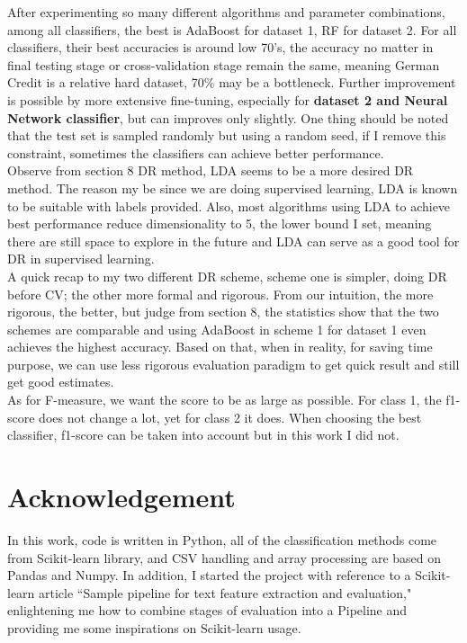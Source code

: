\documentclass[11pt,a4paper]{article}
\begin{document}
After experimenting so many different algorithms and parameter combinations, among all classifiers, the best is AdaBoost for dataset 1, RF for dataset 2. For all classifiers, their best accuracies is around low 70's, the accuracy no matter in final testing stage or cross-validation stage remain the same, meaning German Credit is a relative hard dataset, 70\% may be a bottleneck. Further improvement is possible by more extensive fine-tuning, especially for \textbf{dataset 2 and Neural Network classifier}, but can improves only slightly. One thing should be noted that the test set is sampled randomly but using a random seed, if I remove this constraint, sometimes the classifiers can achieve better performance.\\

Observe from section 8 DR method, LDA seems to be a more desired DR method. The reason my be since we are doing supervised learning, LDA is known to be suitable with labels provided. Also, most algorithms using LDA to achieve best performance reduce dimensionality to 5, the lower bound I set, meaning there are still space to explore in the future and LDA can serve as a good tool for DR in supervised learning.\\

A quick recap to my two different DR scheme, scheme one is simpler, doing DR before CV; the other more formal and rigorous. From our intuition, the more rigorous, the better, but judge from section 8, the statistics show that the two schemes are comparable and using AdaBoost in scheme 1 for dataset 1 even achieves the highest accuracy. Based on that, when in reality, for saving time purpose, we can use less rigorous evaluation paradigm to get quick result and still get good estimates.\\

As for F-measure, we want the score to be as large as possible. For class 1, the f1-score does not change a lot, yet for class 2 it does. When choosing the best classifier, f1-score can be taken into account but in this work I did not.



\section{Acknowledgement} 

In this work, code is written in Python, all of the classification methods come from Scikit-learn library, and CSV handling and array processing are based on Pandas and Numpy. In addition, I started the project with reference to a Scikit-learn article ``Sample pipeline for text feature extraction and evaluation," enlightening me how to combine stages of evaluation into a Pipeline and providing me some inspirations on Scikit-learn usage.
\end{document}
